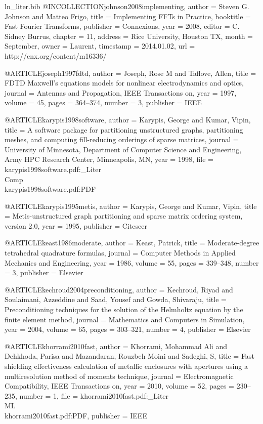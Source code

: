 \begin{filecontents*}{ln_liter.bib}
@INCOLLECTION{johnson2008implementing,
  author = {Steven G. Johnson and Matteo Frigo},
  title = {Implementing {FFT}s in Practice},
  booktitle = {Fast Fourier Transforms},
  publisher = {Connexions},
  year = {2008},
  editor = {C. Sidney Burrus},
  chapter = {11},
  address = {Rice University, Houston TX},
  month = {September},
  owner = {Laurent},
  timestamp = {2014.01.02},
  url = {http://cnx.org/content/m16336/}
}

@ARTICLE{joseph1997fdtd,
  author = {Joseph, Rose M and Taflove, Allen},
  title = {{FDTD} {M}axwell's equations models for nonlinear electrodynamics
	and optics},
  journal = {Antennas and Propagation, IEEE Transactions on},
  year = {1997},
  volume = {45},
  pages = {364--374},
  number = {3},
  publisher = {IEEE}
}

@ARTICLE{karypis1998software,
  author = {Karypis, George and Kumar, Vipin},
  title = {A software package for partitioning unstructured graphs, partitioning
	meshes, and computing fill-reducing orderings of sparse matrices},
  journal = {University of Minnesota, Department of Computer Science and Engineering,
	Army HPC Research Center, Minneapolis, MN},
  year = {1998},
  file = {karypis1998software.pdf:_Liter\\Comp\\karypis1998software.pdf:PDF}
}

@ARTICLE{karypis1995metis,
  author = {Karypis, George and Kumar, Vipin},
  title = {{Metis}-unstructured graph partitioning and sparse matrix ordering
	system, version 2.0},
  year = {1995},
  publisher = {Citeseer}
}

@ARTICLE{keast1986moderate,
  author = {Keast, Patrick},
  title = {Moderate-degree tetrahedral quadrature formulas},
  journal = {Computer Methods in Applied Mechanics and Engineering},
  year = {1986},
  volume = {55},
  pages = {339--348},
  number = {3},
  publisher = {Elsevier}
}

@ARTICLE{kechroud2004preconditioning,
  author = {Kechroud, Riyad and Soulaimani, Azzeddine and Saad, Yousef and Gowda,
	Shivaraju},
  title = {Preconditioning techniques for the solution of the {Helmholtz} equation
	by the finite element method},
  journal = {Mathematics and Computers in Simulation},
  year = {2004},
  volume = {65},
  pages = {303--321},
  number = {4},
  publisher = {Elsevier}
}

@ARTICLE{khorrami2010fast,
  author = {Khorrami, Mohammad Ali and Dehkhoda, Parisa and Mazandaran, Rouzbeh
	Moini and Sadeghi, S},
  title = {Fast shielding effectiveness calculation of metallic enclosures with
	apertures using a multiresolution method of moments technique},
  journal = {Electromagnetic Compatibility, IEEE Transactions on},
  year = {2010},
  volume = {52},
  pages = {230--235},
  number = {1},
  file = {khorrami2010fast.pdf:_Liter\\ML\\khorrami2010fast.pdf:PDF},
  publisher = {IEEE}
}


\end{filecontents*}
